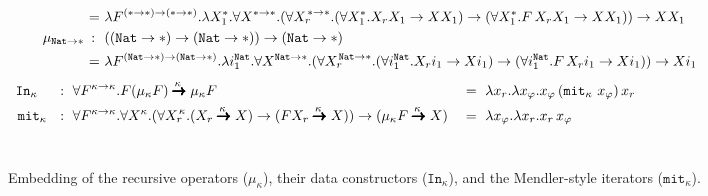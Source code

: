 \begin{figure*}
\begin{align*}
&            &\!\!\!\!\!=~&
  \l F^{(*-> *) -> (*-> *)}.\l X_1^{*}.
   \forall X^{* -> *}.(\forall {X_r}^{\!\!* -> *}.
   (\forall X_1^{*}.X_r X_1 -> X X_1) -> (\forall X_1^{*}.F\,X_r X_1 -> X X_1)) -> X X_1 \\
  &\mu_{\mathtt{Nat}-> *} &\!\!\!\!\!~:~~& ((\mathtt{Nat} -> *) -> (\mathtt{Nat} -> *)) -> (\mathtt{Nat} -> *) \\
&            &\!\!\!\!\!=~&
  \l F^{(\mathtt{Nat}-> *) -> (\mathtt{Nat}-> *)}.\l i_1^\mathtt{Nat}.
  \forall X^{\mathtt{Nat} -> *}.(\forall {X_r}^{\!\!\mathtt{Nat} -> *}.
  (\forall i_1^\mathtt{Nat}.X_r i_1 -> X i_1) -> (\forall i_1^\mathtt{Nat}.F\,X_r i_1 -> X i_1)) -> X i_1 \qquad\qquad
\end{align*}
\begin{align*}
\mathtt{In}_{\kappa} \,~\,&~~:~ \forall F^{\kappa-> \kappa}.
	F(\mu_\kappa F) \stackrel{\kappa\;}{\pmb{\pmb{->}}} \mu_\kappa F
&&=~ \lambda x_r. \lambda x_\varphi.x_\varphi\,(\mathtt{mit}_\kappa~x_\varphi)\,x_r
	\qquad~\qquad~\qquad~\qquad~\quad \\
\mathtt{mit}_\kappa &~~:~ \forall F^{\kappa-> \kappa}.\forall X^\kappa.
	(\forall {X_r}^{\!\!\kappa}.
	 (X_r \stackrel{\kappa\;}{\pmb{\pmb{->}}} X) ->
	 (F X_r \stackrel{\kappa\;}{\pmb{\pmb{->}}} X) ) ->
	(\mu_\kappa F \stackrel{\kappa\;}{\pmb{\pmb{->}}} X)
&&=~ \lambda x_\varphi.\lambda x_r.x_r\,x_\varphi
\end{align*} ~ \vspace*{-10pt}
\caption{Embedding of the recursive operators ($\mu_\kappa$),
	their data constructors ($\mathtt{In}_\kappa$),
	and the Mendler-style iterators ($\mathtt{mit}_\kappa$).}
\label{fig:mu}
\end{figure*}

